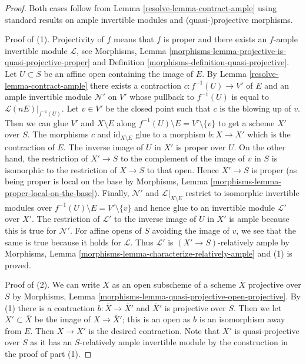 \begin{proof}

Both cases follow from Lemma \ref{resolve-lemma-contract-ample}
using standard results on ample invertible modules and
(quasi-)projective morphisms.

\medskip\noindent
Proof of (1). Projectivity of $f$ means that $f$ is proper and there exists
an $f$-ample invertible module $\mathcal{L}$, see
Morphisms, Lemma \ref{morphisms-lemma-projective-is-quasi-projective-proper}
and Definition \ref{morphisms-definition-quasi-projective}.
Let $U \subset S$ be an affine open containing the image of $E$.
By Lemma \ref{resolve-lemma-contract-ample} there exists a contraction
$c : f^{-1}(U) \to V'$ of $E$ and an ample invertible module
$\mathcal{N}'$ on $V'$ whose pullback to $f^{-1}(U)$ is equal to
$\mathcal{L}(nE)|_{f^{-1}(U)}$. Let $v \in V'$ be the closed point
such that $c$ is the blowing up of $v$.
Then we can glue $V'$ and $X \setminus E$ along
$f^{-1}(U) \setminus E = V' \setminus \{v\}$
to get a scheme $X'$ over $S$. The morphisms $c$ and
$\text{id}_{X \setminus E}$ glue to a morphism $b : X \to X'$
which is the contraction of $E$. The inverse image of $U$ in $X'$
is proper over $U$. On the other hand, the restriction of $X' \to S$
to the complement of the image of $v$ in $S$ is isomorphic to the
restriction of $X \to S$ to that open. Hence $X' \to S$ is proper
(as being proper is local on the base by
Morphisms, Lemma \ref{morphisms-lemma-proper-local-on-the-base}).
Finally, $\mathcal{N}'$ and $\mathcal{L}|_{X \setminus E}$ restrict to
isomorphic invertible modules over $f^{-1}(U) \setminus E = V' \setminus \{v\}$
and hence glue to an invertible module $\mathcal{L}'$ over $X'$.
The restriction of $\mathcal{L}'$ to the inverse image of $U$
in $X'$ is ample because this is true for $\mathcal{N}'$.
For affine opens of $S$ avoiding the image of $v$, we see that
the same is true because it holds for $\mathcal{L}$.
Thus $\mathcal{L}'$ is $(X' \to S)$-relatively ample by
Morphisms, Lemma \ref{morphisms-lemma-characterize-relatively-ample}
and (1) is proved.

\medskip\noindent
Proof of (2). We can write $X$ as an open subscheme of a scheme
$\overline{X}$ projective over $S$ by Morphisms, Lemma
\ref{morphisms-lemma-quasi-projective-open-projective}.
By (1) there is a contraction $b : \overline{X} \to \overline{X}'$
and $\overline{X}'$ is projective over $S$. Then we let
$X' \subset \overline{X}$ be the image of $X \to \overline{X}'$;
this is an open as $b$ is an isomorphism away from $E$.
Then $X \to X'$ is the desired contraction. Note that
$X'$ is quasi-projective over $S$ as it has an
$S$-relatively ample invertible module
by the construction in the proof of part (1).
\end{proof}

